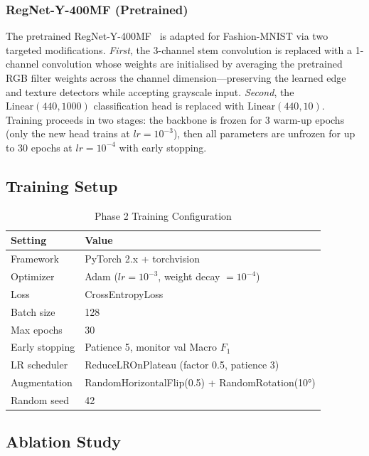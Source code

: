\documentclass[conference]{IEEEtran}
\begin{document}
\subsubsection{RegNet-Y-400MF (Pretrained)}

The pretrained RegNet-Y-400MF~\cite{radosavovic2020designing} is adapted
for Fashion-MNIST via two targeted modifications. \emph{First}, the
3-channel stem convolution is replaced with a 1-channel convolution whose
weights are initialised by averaging the pretrained RGB filter weights
across the channel dimension---preserving the learned edge and texture
detectors while accepting grayscale input. \emph{Second}, the
$\text{Linear}(440, 1000)$ classification head is replaced with
$\text{Linear}(440, 10)$. Training proceeds in two stages: the backbone
is frozen for 3 warm-up epochs (only the new head trains at $lr=10^{-3}$),
then all parameters are unfrozen for up to 30 epochs at $lr=10^{-4}$
with early stopping.

\subsection{Training Setup}

\begin{table}[h]
\centering
\caption{Phase 2 Training Configuration}
\label{tab:training}
\small
\begin{tabular}{ll}
\toprule
\textbf{Setting} & \textbf{Value} \\
\midrule
Framework       & PyTorch 2.x + torchvision \\
Optimizer       & Adam ($lr=10^{-3}$, weight decay $=10^{-4}$) \\
Loss            & CrossEntropyLoss \\
Batch size      & 128 \\
Max epochs      & 30 \\
Early stopping  & Patience 5, monitor val Macro $F_1$ \\
LR scheduler    & ReduceLROnPlateau (factor 0.5, patience 3) \\
Augmentation    & RandomHorizontalFlip(0.5) + RandomRotation(10°) \\
Random seed     & 42 \\
\bottomrule
\end{tabular}
\end{table}

\subsection{Ablation Study}
\end{document}
